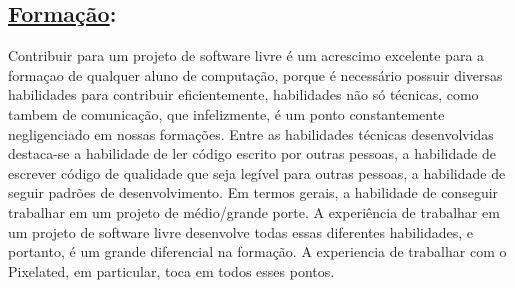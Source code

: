 \subsection*{\underline{Formação}:}

Contribuir para um projeto de software livre é um acrescimo excelente para a formaçao de qualquer aluno de computação, porque é necessário possuir diversas habilidades para contribuir eficientemente, habilidades não só técnicas, como tambem de comunicação, que infelizmente, é um ponto constantemente negligenciado em nossas formações.
Entre as habilidades técnicas desenvolvidas destaca-se a habilidade de ler código escrito por outras pessoas, a habilidade de escrever código de qualidade que seja legível para outras pessoas, a habilidade de seguir padrões de desenvolvimento. Em termos gerais, a habilidade de conseguir trabalhar em um projeto de médio/grande porte.
A experiência de trabalhar em um projeto de software livre desenvolve todas essas diferentes habilidades, e portanto, é um grande diferencial na formação.
A experiencia de trabalhar com o Pixelated, em particular, toca em todos esses pontos.
